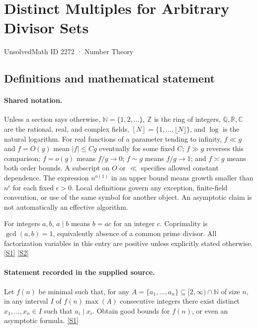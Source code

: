 \documentclass[11pt,a4paper]{article}
\newcommand{\N}{\mathbb{N}}
\newcommand{\Z}{\mathbb{Z}}
\newcommand{\Q}{\mathbb{Q}}
\newcommand{\R}{\mathbb{R}}
\newcommand{\C}{\mathbb{C}}
\newcommand{\sref}[2]{\hyperlink{source:#1:#2}{[S#2]}}
\begin{document}

\setcounter{section}{2271}

\section{Distinct Multiples for Arbitrary Divisor Sets}\label{2272}

{\small\sffamily UnsolvedMath ID 2272 · Number Theory}

\subsection{Definitions and mathematical statement}

\paragraph{Shared notation.}Unless a section says otherwise, $\N=\{1,2,\ldots\}$,
$\Z$ is the ring of integers, $\Q,\R,\C$ are the rational, real, and complex
fields, $[N]=\{1,\ldots,\lfloor N\rfloor\}$, and $\log$ is the natural
logarithm. For real functions of a parameter tending to infinity,
$f\ll g$ and $f=O(g)$ mean $|f|\leq Cg$ eventually for some fixed $C$;
$f\gg g$ reverses this comparison; $f=o(g)$ means $f/g\to0$;
$f\sim g$ means $f/g\to1$; and $f\asymp g$ means both order bounds.
A subscript on $O$ or $\ll$ specifies allowed constant dependence.
The expression $n^{o(1)}$ in an upper bound means growth smaller than
$n^\epsilon$ for each fixed $\epsilon>0$. Local definitions govern any
exception, finite-field convention, or use of the same symbol for another
object. An asymptotic claim is not automatically an effective algorithm.



For integers $a,b$, $a\mid b$ means $b=ac$ for an integer $c$. Coprimality is $\gcd(a,b)=1$, equivalently absence of a common prime divisor. All factorization variables in this entry are positive unless explicitly stated otherwise. \sref{2272}{1} \sref{2272}{2}

\paragraph{Statement recorded in the supplied source.}
Let $f(n)$ be minimal such that, for any $A=\{a_1,\ldots,a_n\}\subseteq [2,\infty)\cap\mathbb{N}$ of size $n$, in any interval $I$ of $f(n)\max(A)$ consecutive integers there exist distinct $x_1,\ldots,x_n\in I$ such that $a_i\mid x_i$.
Obtain good bounds for $f(n)$, or even an asymptotic formula. \sref{2272}{1}
\end{document}
